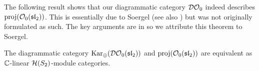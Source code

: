 
The following result shows that our diagrammatic category $\mathcal{DO}_0$ indeed describes $\operatorname{proj}(\mathcal{O}_0(\operatorname{\mathfrak{sl}}_2))$.  This is essentially due to Soergel \cite[Endomorhihsmensatz 7, Struktursatz 9 and Section 2.4]{soergel-category-O} (see also \cite{soergel-combinatorics-of-hcbim}) but was not originally formulated as such. The key arguments are in \cite{soergel-category-O} so we attribute this theorem to Soergel.


\begin{theorem}
    The diagrammatic category $\operatorname{Kar_\oplus}(\mathcal{DO}_0(\operatorname{\mathfrak{sl}}_2))$ and $\operatorname{proj}(\mathcal{O}_0(\operatorname{\mathfrak{sl}}_2))$ are equivalent as $\mathbb{C}$-linear $\mathcal{H}(S_2)$-module categories.
\end{theorem}



